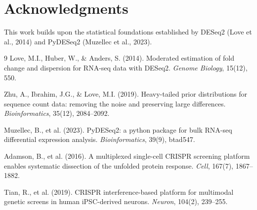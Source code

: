 \documentclass[11pt]{article}
\theoremstyle{definition}
\theoremstyle{remark}
\begin{document}
\section*{Acknowledgments}

This work builds upon the statistical foundations established by DESeq2 (Love et al., 2014) and PyDESeq2 (Muzellec et al., 2023).


\begin{thebibliography}{9}
Love, M.I., Huber, W., \& Anders, S. (2014). Moderated estimation of fold change and dispersion for RNA-seq data with DESeq2. \textit{Genome Biology}, 15(12), 550.

Zhu, A., Ibrahim, J.G., \& Love, M.I. (2019). Heavy-tailed prior distributions for sequence count data: removing the noise and preserving large differences. \textit{Bioinformatics}, 35(12), 2084--2092.

Muzellec, B., et al. (2023). PyDESeq2: a python package for bulk RNA-seq differential expression analysis. \textit{Bioinformatics}, 39(9), btad547.

Adamson, B., et al. (2016). A multiplexed single-cell CRISPR screening platform enables systematic dissection of the unfolded protein response. \textit{Cell}, 167(7), 1867--1882.

Tian, R., et al. (2019). CRISPR interference-based platform for multimodal genetic screens in human iPSC-derived neurons. \textit{Neuron}, 104(2), 239--255.
\end{thebibliography}
\end{document}
